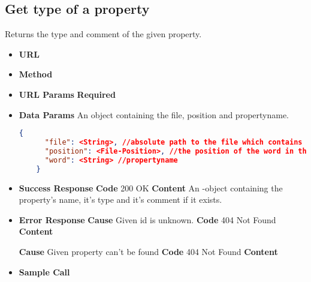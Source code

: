 \subsection{Get type of a property}
Returns the type and comment of the given property.
\begin{itemize}
\item \textbf{URL} 
\item \textbf{Method} 

\item \textbf{URL Params}
  \newline\textbf{Required} 

\item \textbf{Data Params} An object containing the file, position and propertyname.
  \newline{}
  \begin{lstlisting}[basicstyle=\small,language=json]
    {
      "file": <String>, //absolute path to the file which contains the word/symbol
      "position": <File-Position>, //the position of the word in the file
      "word": <String> //propertyname
    }
    \end{lstlisting}

\item \textbf{Success Response}
  \newline\textbf{Code} 200 OK
  \newline\textbf{Content} An -object containing the property's name,
  it's type and it's comment if it exists.
  
\item \textbf{Error Response}
  \newline\textbf{Cause} Given id is unknown.
  \newline\textbf{Code} 404 Not Found
  \newline\textbf{Content} 

  \fixedspace\textbf{Cause} Given property can't be found
  \newline\textbf{Code} 404 Not Found
  \newline\textbf{Content} 

\item \textbf{Sample Call}
\end{itemize}
